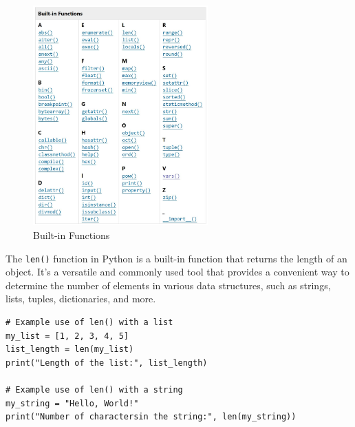 \begin{figure}[h!]
    \centering
    \includegraphics[width=0.6\textwidth]{images/built_in.JPG}
    \caption{Built-in Functions}
    \label{fig:misc-1}
\end{figure}

The \texttt{len()} function in Python is a built-in function that returns the length of an object. It's a versatile and commonly used tool that provides a convenient way to determine the number of elements in various data structures, such as strings, lists, tuples, dictionaries, and more.

\begin{codebox}
\begin{verbatim}
# Example use of len() with a list
my_list = [1, 2, 3, 4, 5]
list_length = len(my_list)
print("Length of the list:", list_length)

# Example use of len() with a string
my_string = "Hello, World!"
print("Number of charactersin the string:", len(my_string))
\end{verbatim}
\end{codebox}

\newpage

